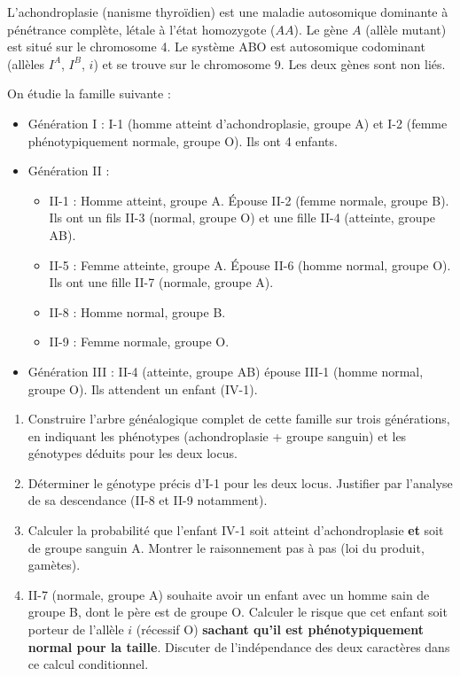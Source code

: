 \documentclass[11pt]{article}
\begin{document}
\begin{exercice}
L'achondroplasie (nanisme thyroïdien) est une maladie autosomique dominante à pénétrance complète, létale à l'état homozygote ($AA$). Le gène $A$ (allèle mutant) est situé sur le chromosome 4. Le système ABO est autosomique codominant (allèles $I^A$, $I^B$, $i$) et se trouve sur le chromosome 9. Les deux gènes sont non liés.

On étudie la famille suivante :
\begin{itemize}
    \item Génération I : I-1 (homme atteint d'achondroplasie, groupe A) et I-2 (femme phénotypiquement normale, groupe O). Ils ont 4 enfants.
    \item Génération II :
    \begin{itemize}
        \item II-1 : Homme atteint, groupe A. Épouse II-2 (femme normale, groupe B). Ils ont un fils II-3 (normal, groupe O) et une fille II-4 (atteinte, groupe AB).
        \item II-5 : Femme atteinte, groupe A. Épouse II-6 (homme normal, groupe O). Ils ont une fille II-7 (normale, groupe A).
        \item II-8 : Homme normal, groupe B.
        \item II-9 : Femme normale, groupe O.
    \end{itemize}
    \item Génération III : II-4 (atteinte, groupe AB) épouse III-1 (homme normal, groupe O). Ils attendent un enfant (IV-1).
\end{itemize}

\begin{enumerate}
    \item Construire l'arbre généalogique complet de cette famille sur trois générations, en indiquant les phénotypes (achondroplasie + groupe sanguin) et les génotypes déduits pour les deux locus.
    \item Déterminer le génotype précis d'I-1 pour les deux locus. Justifier par l'analyse de sa descendance (II-8 et II-9 notamment).
    \item Calculer la probabilité que l'enfant IV-1 soit atteint d'achondroplasie \textbf{et} soit de groupe sanguin A. Montrer le raisonnement pas à pas (loi du produit, gamètes).
    \item II-7 (normale, groupe A) souhaite avoir un enfant avec un homme sain de groupe B, dont le père est de groupe O. Calculer le risque que cet enfant soit porteur de l'allèle $i$ (récessif O) \textbf{sachant qu'il est phénotypiquement normal pour la taille}. Discuter de l'indépendance des deux caractères dans ce calcul conditionnel.
\end{enumerate}
\end{exercice}
\end{document}
